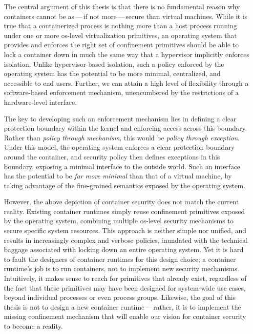 \documentclass[
  fontsize=12pt,
  titlepage=firstiscover,
  paper=letter,
oneside,
  cleardoublepage=plain,
  parskip=half-,
  DIV=10,
  parindent,
  appendixprefix,
  chapterprefix,
  listof=totoc,
]{scrbook}
\begin{document}
The central argument of this thesis is that there is no fundamental reason why containers
cannot be as\,---\,if not more\,---\,secure than virtual machines.  While it is true that
a containerized process is nothing more than a host process running under one or more
\gls{os}-level virtualization primitives, an operating system that provides and enforces
the right set of confinement primitives should be able to lock a container down in much
the same way that a hypervisor implicitly enforces isolation.  Unlike hypervisor-based
isolation, such a policy enforced by the operating system has the potential to be more
minimal, centralized, and accessible to end users. Further, we can attain a high level of
flexibility through a software-based enforcement mechanism, unencumbered by the
restrictions of a hardware-level interface.

The key to developing such an enforcement mechanism lies in defining a clear protection
boundary within the kernel and enforcing access across this boundary. Rather than
\textit{policy through mechanism}, this would be \textit{policy through exception}. Under
this model, the operating system enforces a clear protection boundary around the
container, and security policy then defines exceptions in this boundary, exposing
a minimal interface to the outside world.  Such an interface has the potential to be
\textit{far more minimal}  than that of a virtual machine, by taking advantage of the
fine-grained semantics exposed by the operating system.

However, the above depiction of container security does not match the current reality.
Existing container runtimes simply reuse confinement primitives exposed by the operating
system, combining multiple \gls{os}-level security mechanisms to secure specific system
resources.  This approach is neither simple nor unified, and results in increasingly
complex and verbose policies, inundated with the technical baggage associated with locking
down an entire operating system. Yet it is hard to fault the designers of container
runtimes for this design choice; a container runtime's job is to run containers, not to
implement new security mechanisms. Intuitively, it makes sense to reach for primitives
that already exist, regardless of the fact that these primitives may have been designed
for system-wide use cases, beyond individual processes or even process groups. Likewise,
the goal of this thesis is not to design a new container runtime\,---\,rather, it is to
implement the missing confinement mechanism that will enable our vision for container
security to become a reality.
\end{document}
